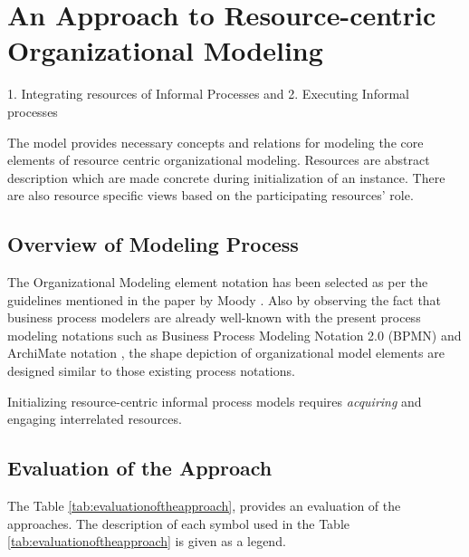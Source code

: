 \chapter{An Approach to Resource-centric Organizational Modeling}
\label{chap:approach}


1. Integrating resources of Informal Processes and 
2. Executing Informal processes

The model provides necessary concepts and relations for modeling the core elements of resource centric organizational modeling. Resources are abstract description which are made concrete during initialization of an instance. There are also resource specific views based on the participating resources' role. 

\section{Overview of Modeling Process}
\label{sec:overviewmodelingprocess}
 The Organizational Modeling element notation has been selected as per the guidelines mentioned in the paper by Moody \cite{Moody2009}. Also by observing  the fact that business process modelers are already well-known with the present process modeling notations such as Business Process Modeling Notation 2.0 (BPMN) \cite{bpm2011} and ArchiMate notation \cite{arc2013}, the shape depiction of organizational model elements are designed similar to those existing process notations. 


Initializing resource-centric informal process models requires \textit{acquiring} and engaging interrelated resources.

\section{Evaluation of the Approach}
\label{sec:evaluationoftheapproach}

The Table \ref{tab:evaluationoftheapproach}, provides an evaluation of the approaches. The description of each symbol used in the  Table \ref{tab:evaluationoftheapproach} is given as a legend.


